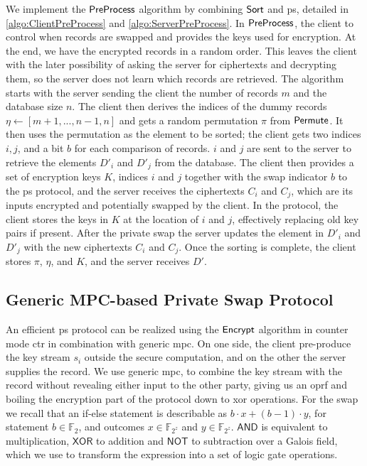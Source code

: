We implement the $ \mathsf{{PreProcess}} $ algorithm by combining $ \mathsf{{Sort}} $ and \acrshort{ps}, detailed in \cref{algo:ClientPreProcess} and \cref{algo:ServerPreProcess}. In $ \mathsf{{PreProcess}} $, the client to control when records are swapped and provides the keys used for encryption. At the end, we have the encrypted records in a random order. This leaves the client with the later possibility of asking the server for ciphertexts and decrypting them, so the server does not learn which records are retrieved. The algorithm starts with the server sending the client the number of records $ m $ and the database size $ n $. The client then derives the indices of the dummy records $ \eta \gets \left[ m + 1, ... , n - 1, n \right]  $ and gets a random permutation $ \pi $ from $ \mathsf{{Permute}} $. It then uses the permutation as the element to be sorted; the client gets two indices $ i, j $, and a bit $ b $ for each comparison of records. $ i $ and $ j $ are sent to the server to retrieve the elements $ D'_i $ and $ D'_j $ from the database. The client then provides a set of encryption keys $ K $, indices $ i $ and $ j $ together with the swap indicator $ b $ to the \acrshort{ps} protocol, and the server receives the ciphertexts $ C_i $ and $ C_j $, which are its inputs encrypted and potentially swapped by the client. In the protocol, the client stores the keys in $ K $ at the location of $ i $ and $ j $, effectively replacing old key pairs if present. After the private swap the server updates the element in $ D'_i $ and $ D'_j $ with the new ciphertexts $ C_i $ and $ C_j $. Once the sorting is complete, the client stores $ \pi $, $ \eta $, and $ K $, and the server receives $ D' $.


\subsection*{\thesubsection\quad Generic MPC-based Private Swap Protocol}\label{subsec:MPCPSProtocol}

\newcommand{\AND}{\ensuremath{\mathsf{{AND}}}}
\newcommand{\XOR}{\ensuremath{\mathsf{{XOR}}}}
\newcommand{\NOT}{\ensuremath{\mathsf{{NOT}}}}
An efficient \acrshort{ps} protocol can be realized using the $ \mathsf{{Encrypt}} $ algorithm in counter mode \acrshort{ctr} in combination with generic \acrshort{mpc}. On one side, the client pre-produce the key stream $ s_i $ outside the secure computation, and on the other the server supplies the record. We use generic \acrshort{mpc}, to combine the key stream with the record without revealing either input to the other party, giving us an \acrshort{oprf} and boiling the encryption part of the protocol down to \acrshort{xor} operations. For the swap we recall that an if-else statement is describable as $ b \cdot x + \left( b - 1 \right) \cdot y $, for statement $ b \in \mathbb{F}_2 $, and outcomes $ x \in \mathbb{F}_{2^z} $ and $ y \in \mathbb{F}_{2^z} $. $ \AND $ is equivalent to multiplication, $ \XOR $ to addition and $ \NOT $ to subtraction over a Galois field, which we use to transform the expression into a set of logic gate operations.

